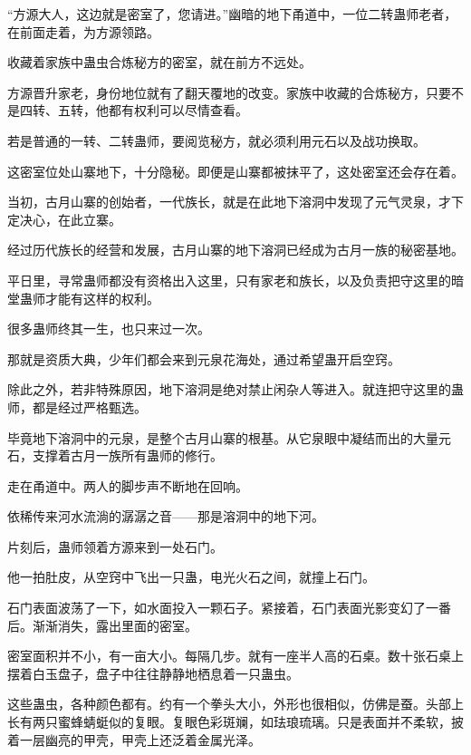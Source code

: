 
\begin{this_body}



“方源大人，这边就是密室了，您请进。”幽暗的地下甬道中，一位二转蛊师老者，在前面走着，为方源领路。

收藏着家族中蛊虫合炼秘方的密室，就在前方不远处。

方源晋升家老，身份地位就有了翻天覆地的改变。家族中收藏的合炼秘方，只要不是四转、五转，他都有权利可以尽情查看。

若是普通的一转、二转蛊师，要阅览秘方，就必须利用元石以及战功换取。

这密室位处山寨地下，十分隐秘。即便是山寨都被抹平了，这处密室还会存在着。

当初，古月山寨的创始者，一代族长，就是在此地下溶洞中发现了元气灵泉，才下定决心，在此立寨。

经过历代族长的经营和发展，古月山寨的地下溶洞已经成为古月一族的秘密基地。

平日里，寻常蛊师都没有资格出入这里，只有家老和族长，以及负责把守这里的暗堂蛊师才能有这样的权利。

很多蛊师终其一生，也只来过一次。

那就是资质大典，少年们都会来到元泉花海处，通过希望蛊开启空窍。

除此之外，若非特殊原因，地下溶洞是绝对禁止闲杂人等进入。就连把守这里的蛊师，都是经过严格甄选。

毕竟地下溶洞中的元泉，是整个古月山寨的根基。从它泉眼中凝结而出的大量元石，支撑着古月一族所有蛊师的修行。

走在甬道中。两人的脚步声不断地在回响。

依稀传来河水流淌的潺潺之音——那是溶洞中的地下河。

片刻后，蛊师领着方源来到一处石门。

他一拍肚皮，从空窍中飞出一只蛊，电光火石之间，就撞上石门。

石门表面波荡了一下，如水面投入一颗石子。紧接着，石门表面光影变幻了一番后。渐渐消失，露出里面的密室。

密室面积并不小，有一亩大小。每隔几步。就有一座半人高的石桌。数十张石桌上摆着白玉盘子，盘子中往往静静地栖息着一只蛊虫。

这些蛊虫，各种颜色都有。约有一个拳头大小，外形也很相似，仿佛是蚕。头部上长有两只蜜蜂蜻蜓似的复眼。复眼色彩斑斓，如珐琅琉璃。只是表面并不柔软，披着一层幽亮的甲壳，甲壳上还泛着金属光泽。


\end{this_body}
